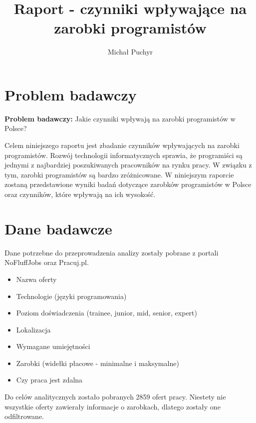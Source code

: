 \documentclass{article}
\title{Raport - czynniki wpływające na zarobki programistów}
\author{Michał Puchyr}
\begin{document}


\section{Problem badawczy}

\textbf{Problem badawczy:} Jakie czynniki wpływają na zarobki programistów w Polsce?

Celem niniejszego raportu jest zbadanie czynników wpływających na zarobki programistów. Rozwój technologii informatycznych sprawia, że programiści są jednymi z najbardziej poszukiwanych pracowników na rynku pracy. W związku z tym, zarobki programistów są bardzo zróżnicowane. W niniejszym raporcie zostaną przedstawione wyniki badań dotyczące zarobków programistów w Polsce oraz czynników, które wpływają na ich wysokość.


\section{Dane badawcze}

Dane potrzebne do przeprowadzenia analizy zostały pobrane z portali NoFluffJobs oraz Pracuj.pl.

\begin{itemize}
    \item Nazwa oferty
    \item Technologie (języki programowania)
    \item Poziom doświadczenia (trainee, junior, mid, senior, expert)
    \item Lokalizacja
    \item Wymagane umiejętności
    \item Zarobki (widełki płacowe - minimalne i maksymalne)
    \item Czy praca jest zdalna
\end{itemize}

\bigskip

Do celów analitycznych zostało pobranych 2859 ofert pracy.
Niestety nie wszystkie oferty zawierały informacje o zarobkach, dlatego zostały one odfiltrowane.
\end{document}

